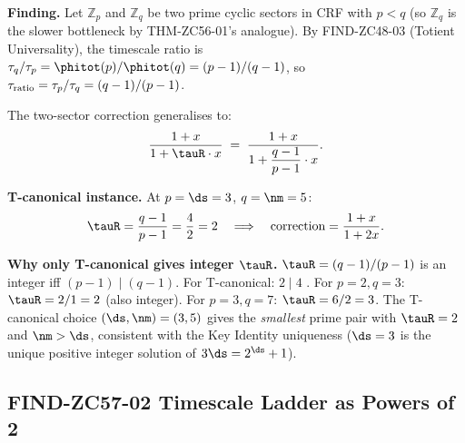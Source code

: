 \documentclass[12pt, a4paper]{article}
\begin{document}

\begin{derivedbox}[title={FIND-ZC57-01: General Two-Sector
  Correction for Prime CRF Sectors ($R_0$, Exact)}]
\textbf{Finding.}
Let $\mathbb{Z}_p$ and $\mathbb{Z}_q$ be two prime cyclic sectors
in CRF with $p < q$ (so $\mathbb{Z}_q$ is the slower bottleneck
by THM-ZC56-01's analogue).
By FIND-ZC48-03 (Totient Universality), the timescale ratio is
$\tau_q/\tau_p = \phitot(p)/\phitot(q) = (p-1)/(q-1)$, so
$\tau_{\rm ratio}=\tau_p/\tau_q=(q-1)/(p-1)$.

The two-sector correction generalises to:
\begin{equation}
  \frac{1+x}{1+\tauR\cdot x}
  \;=\; \frac{1+x}{1+\dfrac{q-1}{p-1}\cdot x}.
  \label{eq:general-correction}
\end{equation}

\textbf{T-canonical instance.}
At $p=\ds=3$, $q=\nm=5$:
\[
  \tauR = \frac{q-1}{p-1} = \frac{4}{2} = 2
  \quad\Longrightarrow\quad
  \text{correction} = \frac{1+x}{1+2x}.
\]

\textbf{Why only T-canonical gives integer $\tauR$.}
$\tauR=(q-1)/(p-1)$ is an integer iff $(p-1)\mid(q-1)$.
For T-canonical: $2\mid4$ \checkmark.
For $p=2,q=3$: $\tauR=2/1=2$ (also integer).
For $p=3,q=7$: $\tauR=6/2=3$.
The T-canonical choice $(\ds,\nm)=(3,5)$ gives the \emph{smallest}
prime pair with $\tauR=2$ and $\nm>\ds$, consistent with the
Key Identity uniqueness ($\ds=3$ is the unique positive integer
solution of $3\ds=2^{\ds}+1$).
\end{derivedbox}

\subsection{FIND-ZC57-02 \quad Timescale Ladder as Powers of 2}
\label{sec:find02}

\end{document}
